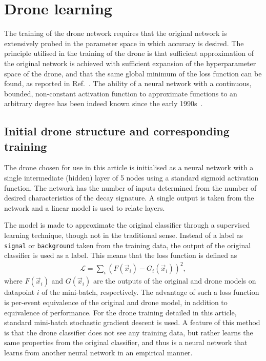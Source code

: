 \section{Drone learning}
\label{sec:dlearn}

The training of the drone network requires that the original network is
extensively probed in the parameter space in which accuracy is desired.
The principle utilised in the training of the drone is that sufficient
approximation of the original network is achieved with sufficient expansion
of the hyperparameter space of the drone, and that the same global minimum
of the loss function can be found, as reported in Ref.~\cite{losssurfaces}.
The ability of a neural network with a continuous, bounded, non-constant activation
function to approximate functions to an arbitrary degree has been indeed known
since the early 1990s~\cite{HORNIK1991251}.

\subsection{Initial drone structure and corresponding training}

The drone chosen for use in this article is initialised as a
neural network with a single intermediate (hidden) layer of 5
nodes using a standard sigmoid activation function. The network
has the number of inputs determined from the number of desired
characteristics of the decay signature. A single output is taken
from the network and a linear model is used to relate layers.

The model is made to approximate the original classifier through
a supervised learning technique, though not in the traditional sense.
Instead of a label as {\tt signal} or {\tt background} taken from the training data, the
output of the original classifier is used as a label. This means that the
loss function is defined as
\begin{align}
\mathcal{L} = \sum_i \left( F(\vec{x}_i) - G_i(\vec{x}_i) \right)^2,
\end{align}
where $F(\vec{x}_i)$ and $G(\vec{x}_i)$ are the outputs
of the original and drone models on datapoint
$i$ of the mini-batch, respectively. The advantage of such a loss function is per-event
equivalence of the original and drone model, in addition to equivalence
of performance. For the drone training detailed in this article, standard
mini-batch stochastic gradient descent is used. A feature of this method
is that the drone classifier does not see any training data,
but rather learns the same properties from the original classifier,
and thus is a neural network that learns from another neural network in an
empirical manner.

